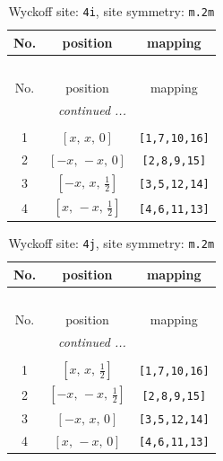 \documentclass[fleqn,8pt]{jsarticle}
\begin{document}
\renewcommand{\arraystretch}{1.2}
\begin{longtable}{ccc}
\caption{Wyckoff site: {\tt 4i}, site symmetry: {\tt m.2m}}
 \\
 \hline \hline
No. & position & mapping \\ \hline \endfirsthead

\multicolumn{2}{l}{\tablename\ \thetable{}} \\
 \hline \hline
No. & position & mapping \\ \hline \endhead

 \hline \hline
\multicolumn{2}{r}{\footnotesize\it continued ...} \\ \endfoot

 \hline \hline
\multicolumn{2}{r}{} \\ \endlastfoot

1 & $\left[ x,\, x,\, 0 \right]$ & {\tt [1,7,10,16]} \\ \hline
2 & $\left[ - x,\, - x,\, 0 \right]$ & {\tt [2,8,9,15]} \\ \hline
3 & $\left[ - x,\, x,\, \frac{1}{2} \right]$ & {\tt [3,5,12,14]} \\ \hline
4 & $\left[ x,\, - x,\, \frac{1}{2} \right]$ & {\tt [4,6,11,13]} \\
\end{longtable}
\renewcommand{\arraystretch}{1.2}
\begin{longtable}{ccc}
\caption{Wyckoff site: {\tt 4j}, site symmetry: {\tt m.2m}}
 \\
 \hline \hline
No. & position & mapping \\ \hline \endfirsthead

\multicolumn{2}{l}{\tablename\ \thetable{}} \\
 \hline \hline
No. & position & mapping \\ \hline \endhead

 \hline \hline
\multicolumn{2}{r}{\footnotesize\it continued ...} \\ \endfoot

 \hline \hline
\multicolumn{2}{r}{} \\ \endlastfoot

1 & $\left[ x,\, x,\, \frac{1}{2} \right]$ & {\tt [1,7,10,16]} \\ \hline
2 & $\left[ - x,\, - x,\, \frac{1}{2} \right]$ & {\tt [2,8,9,15]} \\ \hline
3 & $\left[ - x,\, x,\, 0 \right]$ & {\tt [3,5,12,14]} \\ \hline
4 & $\left[ x,\, - x,\, 0 \right]$ & {\tt [4,6,11,13]} \\
\end{longtable}
\end{document}
